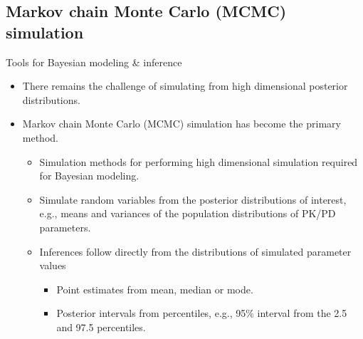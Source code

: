 \documentclass{beamer}
\begin{document}
\subsection{Markov chain Monte Carlo (MCMC) simulation}

\begin{frame}{Tools for Bayesian modeling \& inference}

  \begin{itemize}
  \item There remains the challenge of simulating from high
    dimensional posterior distributions.
  \item Markov chain Monte Carlo (MCMC) simulation has become the
    primary method.
    \begin{itemize}
    \item Simulation methods for performing high dimensional
      simulation required for Bayesian modeling.
    \item Simulate random variables from the posterior distributions
      of interest, e.g., means and variances of the population
      distributions of PK/PD parameters.
    \item Inferences follow directly from the distributions of
      simulated parameter values
      \begin{itemize}
      \item Point estimates from mean, median or mode.
      \item Posterior intervals from percentiles, e.g., 95\% interval
        from the 2.5 and 97.5 percentiles.
      \end{itemize}
    \end{itemize}
  \end{itemize}

\end{frame}
\end{document}
